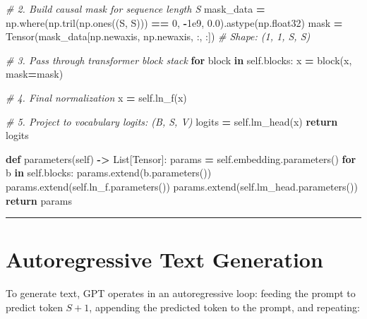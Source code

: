\documentclass[
  letterpaper,
]{scrbook}
\newenvironment{Shaded}{\begin{snugshade}}{\end{snugshade}}
\newcommand{\CommentTok}[1]{\textcolor[rgb]{0.56,0.35,0.01}{\textit{#1}}}
\newcommand{\ControlFlowTok}[1]{\textcolor[rgb]{0.13,0.29,0.53}{\textbf{#1}}}
\newcommand{\DecValTok}[1]{\textcolor[rgb]{0.00,0.00,0.81}{#1}}
\newcommand{\FloatTok}[1]{\textcolor[rgb]{0.00,0.00,0.81}{#1}}
\newcommand{\KeywordTok}[1]{\textcolor[rgb]{0.13,0.29,0.53}{\textbf{#1}}}
\newcommand{\NormalTok}[1]{#1}
\newcommand{\OperatorTok}[1]{\textcolor[rgb]{0.81,0.36,0.00}{\textbf{#1}}}
\newcommand{\VariableTok}[1]{\textcolor[rgb]{0.00,0.00,0.00}{#1}}
\begin{document}
\begin{Shaded}
\begin{Highlighting}[]
        \CommentTok{\# 2. Build causal mask for sequence length S}
\NormalTok{        mask\_data }\OperatorTok{=}\NormalTok{ np.where(np.tril(np.ones((S, S))) }\OperatorTok{==} \DecValTok{0}\NormalTok{, }\OperatorTok{{-}}\FloatTok{1e9}\NormalTok{, }\FloatTok{0.0}\NormalTok{).astype(np.float32)}
\NormalTok{        mask }\OperatorTok{=}\NormalTok{ Tensor(mask\_data[np.newaxis, np.newaxis, :, :])  }\CommentTok{\# Shape: (1, 1, S, S)}

        \CommentTok{\# 3. Pass through transformer block stack}
        \ControlFlowTok{for}\NormalTok{ block }\KeywordTok{in} \VariableTok{self}\NormalTok{.blocks:}
\NormalTok{            x }\OperatorTok{=}\NormalTok{ block(x, mask}\OperatorTok{=}\NormalTok{mask)}

        \CommentTok{\# 4. Final normalization}
\NormalTok{        x }\OperatorTok{=} \VariableTok{self}\NormalTok{.ln\_f(x)}

        \CommentTok{\# 5. Project to vocabulary logits: (B, S, V)}
\NormalTok{        logits }\OperatorTok{=} \VariableTok{self}\NormalTok{.lm\_head(x)}
        \ControlFlowTok{return}\NormalTok{ logits}

    \KeywordTok{def}\NormalTok{ parameters(}\VariableTok{self}\NormalTok{) }\OperatorTok{{-}\textgreater{}}\NormalTok{ List[Tensor]:}
\NormalTok{        params }\OperatorTok{=} \VariableTok{self}\NormalTok{.embedding.parameters()}
        \ControlFlowTok{for}\NormalTok{ b }\KeywordTok{in} \VariableTok{self}\NormalTok{.blocks:}
\NormalTok{            params.extend(b.parameters())}
\NormalTok{        params.extend(}\VariableTok{self}\NormalTok{.ln\_f.parameters())}
\NormalTok{        params.extend(}\VariableTok{self}\NormalTok{.lm\_head.parameters())}
        \ControlFlowTok{return}\NormalTok{ params}
\end{Highlighting}
\end{Shaded}

\begin{center}\rule{0.5\linewidth}{0.5pt}\end{center}

\section{Autoregressive Text
Generation}\label{autoregressive-text-generation}

To generate text, GPT operates in an autoregressive loop: feeding the
prompt to predict token \(S+1\), appending the predicted token to the
prompt, and repeating:
\end{document}
